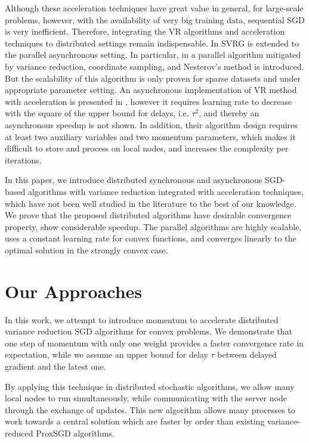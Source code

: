 \documentclass[letterpaper]{article} %
\begin{document}
Although these acceleration techniques have great value in general, for large-scale problems, however, with the availability of very big training data, sequential SGD is very inefficient. Therefore, integrating the VR algorithms and acceleration techniques to distributed settings remain indispensable. In \cite{Reddi2015,Mania2017} SVRG is extended to the parallel asynchronous setting. In particular, in \cite{Meng2016} a parallel algorithm mitigated by variance reduction, coordinate sampling, and Nesterov's method is introduced. But the scalability of this algorithm is only proven for sparse datasets and under appropriate parameter setting. An asynchronous implementation of VR method with acceleration is presented in \cite{fang2018accelerating}, however it requires learning rate to decrease with the square  of the upper bound for delays, i.e. $\tau^2$, and thereby an asynchronous speedup is not shown. In addition, their algorithm design requires at least two auxiliary variables
and two momentum parameters, which makes it difficult to store and process on local nodes, and increases the  complexity per iterations. 


In this paper, we introduce distributed synchronous and asynchronous SGD-based algorithms with variance reduction integrated with acceleration techniques, which have not been well studied in the literature to the best of our knowledge. We prove that the proposed distributed algorithms have desirable convergence property, show considerable speedup. The parallel algorithms are highly scalable, uses a constant learning rate for convex functions, and converges linearly to the optimal solution in the strongly convex case.

\section{Our Approaches}
In this work, we attempt to introduce momentum to accelerate distributed variance reduction SGD algorithms for convex problems. We demonstrate that one step of momentum with only one weight provides a faster convergence rate in expectation, while we assume an upper bound for delay $\tau$ between delayed gradient and the latest one. 

By applying this technique in distributed stochastic algorithms, we allow many local nodes to run simultaneously, while communicating 
with the server node through the exchange of updates. This new algorithm allows many processes to work towards a central solution which are
faster by order than existing variance-reduced ProxSGD algorithms. 
\end{document}
